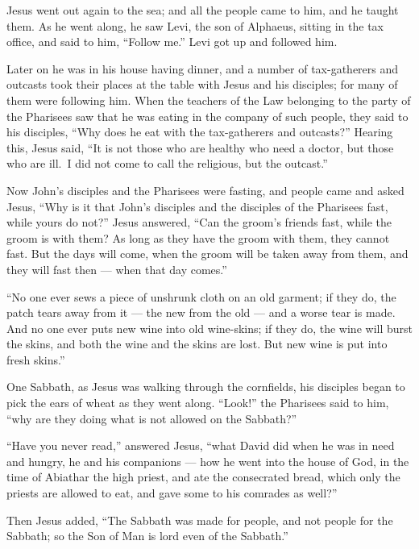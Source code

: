  Jesus went out again to the sea; and all the people came
to him, and he taught them.  As he went along, he saw Levi,
the son of Alphaeus, sitting in the tax office, and said to him,
``Follow me.'' Levi got up and followed him.

 Later on he was in his house having dinner, and a number
of tax-gatherers and outcasts took their places at the table with Jesus
and his disciples; for many of them were following him. 
When the teachers of the Law belonging to the party of the Pharisees saw
that he was eating in the company of such people, they said to his
disciples, ``Why does he eat with the tax-gatherers and outcasts?''
 Hearing this, Jesus said, ``It is not those who are
healthy who need a doctor, but those who are ill.~I did not come to call
the religious, but the outcast.''

 Now John's disciples and the Pharisees were fasting, and
people came and asked Jesus, ``Why is it that John's disciples and the
disciples of the Pharisees fast, while yours do not?'' 
Jesus answered, ``Can the groom's friends fast, while the groom is with
them? As long as they have the groom with them, they cannot fast.
 But the days will come, when the groom will be taken away
from them, and they will fast then --- when that day comes.''

 ``No one ever sews a piece of unshrunk cloth on an old
garment; if they do, the patch tears away from it --- the new from the
old --- and a worse tear is made.  And no one ever puts new
wine into old wine-skins; if they do, the wine will burst the skins, and
both the wine and the skins are lost. But new wine is put into fresh
skins.''

 One Sabbath, as Jesus was walking through the cornfields,
his disciples began to pick the ears of wheat as they went along.
 ``Look!'' the Pharisees said to him, ``why are they doing
what is not allowed on the Sabbath?''

 ``Have you never read,'' answered Jesus, ``what David did
when he was in need and hungry, he and his companions --- 
how he went into the house of God, in the time of Abiathar the high
priest, and ate the consecrated bread, which only the priests are
allowed to eat, and gave some to his comrades as well?''

 Then Jesus added, ``The Sabbath was made for people, and
not people for the Sabbath;  so the Son of Man is lord even
of the Sabbath.''

